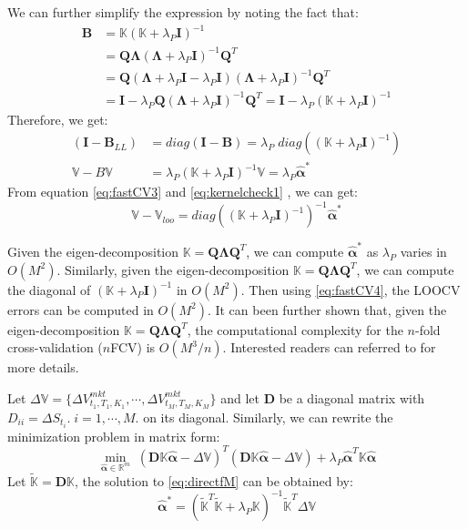 \documentclass[letterpaper,12pt,titlepage,oneside,final]{book}
\numberwithin{equation}{section}
\theoremstyle{definition}
\newcommand{\Real}{\mathbb{R}}
\newcommand{\valpha}{\pmb{\widehat{\alpha}}}
\newcommand{\vK}{\mathbb{K}}
\newcommand{\Vmkt}{V^{mkt}}
\newcommand{\vecVmkt}{\mathbb{V}}
\begin{document}
We can further simplify the expression by noting the fact that:
\[\begin{split}
\pmb{B}&=\vK (\vK+\lambda_P \pmb{I})^{-1} \\
       &=\pmb{Q}\pmb{\Lambda}(\pmb{\Lambda}+\lambda_P \pmb{I})^{-1} \pmb{Q}^T\\
       &=\pmb{Q}(\pmb{\Lambda}+\lambda_P \pmb{I}-\lambda_P \pmb{I})(\pmb{\Lambda}+\lambda_P \pmb{I})^{-1} \pmb{Q}^T\\
       &= \pmb{I}-\lambda_P \pmb{Q} (\pmb{\Lambda}+\lambda_P \pmb{I})^{-1} \pmb{Q}^T=\pmb{I} -\lambda_P  (\vK+\lambda_P \pmb{I})^{-1}
  \end{split}
\]
Therefore, we  get:
\begin{equation}
	\begin{split}
(\pmb{I}-\pmb{B}_{LL})&=diag(\pmb{I}-\pmb{B})=\lambda_P \; diag((\vK+\lambda_P \pmb{I})^{-1})\\
\vecVmkt-B\vecVmkt&=\lambda_P (\vK+\lambda_P \pmb{I})^{-1} \vecVmkt =\lambda_P \valpha^*
\label{eq:kernelcheck1}
	\end{split}
\end{equation}
From  equation \eqref{eq:fastCV3} and \eqref{eq:kernelcheck1} , we can get:
\begin{equation}  \label{eq:fastCV4}
\vecVmkt-\vecVmkt_{loo}=diag((\vK+\lambda_P \pmb{I})^{-1})^{-1} \valpha^*
\end{equation}

Given the eigen-decomposition $\vK=\pmb{Q} \pmb{\Lambda} \pmb{Q}^T$, we can compute  $\valpha^*$ as $\lambda_P$ varies in $O(M^2)$. Similarly, given the eigen-decomposition $\vK=\pmb{Q} \pmb{\Lambda} \pmb{Q}^T$, we can compute the diagonal of $(\vK+\lambda_P \pmb{I})^{-1}$ in $O(M^2)$. Then  using \eqref{eq:fastCV4}, the LOOCV errors can be computed in $O(M^2)$.  It can been further shown \cite{pahikkala2006fast} that, given the eigen-decomposition $\vK=\pmb{Q} \pmb{\Lambda} \pmb{Q}^T$, the computational complexity for the $n$-fold cross-validation ($n$FCV) is $O(M^3/n)$. Interested readers can referred to \citep{pahikkala2006fast} for more details.

Let $\Delta \vecVmkt=\{\Delta \Vmkt_{t_1,T_1,K_1},\cdots,\Delta \Vmkt_{t_M,T_M,K_M}\}$ and  let $\pmb{D}$ be a diagonal matrix with $D_{ii}=\Delta S_{t_i}. \;i=1,\cdots,M.$ on its diagonal.
Similarly, we can rewrite  the minimization problem in  matrix form:
\begin{equation}
\min_{\valpha \in \Real^m} \; ( \pmb{D} \vK \valpha - \Delta \vecVmkt)^T (\pmb{D}  \vK \valpha -\Delta \vecVmkt)+ \lambda_P \valpha^T\vK\valpha
\label{eq:directfM}
\end{equation}
Let $\widetilde{\vK}=\pmb{D}\vK$, the solution to \eqref{eq:directfM} can be obtained by:
\[
\valpha^* = (\widetilde{\vK}^T\widetilde{\vK}  + \lambda_P \vK)^{-1} \widetilde{\vK}^T \Delta \vecVmkt
\]
\end{document}
